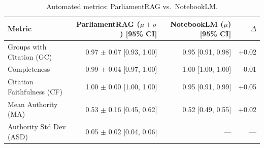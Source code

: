 \begin{table}[htbp]
\centering
\caption{Automated metrics: ParliamentRAG vs.\ NotebookLM.}
\label{tab:automated_metrics}
\small
\begin{tabular}{lrrr}
\toprule
Metric & ParliamentRAG ($\mu \pm \sigma$) [95\% CI] & NotebookLM ($\mu$) [95\% CI] & $\Delta$ \\
\midrule
Groups with Citation (GC) & 0.97 $\pm$ 0.07 [0.93, 1.00] & 0.95 [0.91, 0.98] & +0.02 \\
Completeness & 0.99 $\pm$ 0.04 [0.97, 1.00] & 1.00 [1.00, 1.00] & -0.01 \\
Citation Faithfulness (CF) & 1.00 $\pm$ 0.00 [1.00, 1.00] & 0.95 [0.91, 0.99] & +0.05 \\
Mean Authority (MA) & 0.53 $\pm$ 0.16 [0.45, 0.62] & 0.52 [0.49, 0.55] & +0.02 \\
Authority Std Dev (ASD) & 0.05 $\pm$ 0.02 [0.04, 0.06] & --- & --- \\
\bottomrule
\end{tabular}
\end{table}